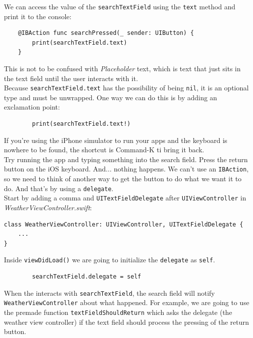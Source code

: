 \documentclass[11pt, letterpaper]{article}
\begin{document}
We can access the value of the \verb+searchTextField+ using the \verb+text+ method and print it to the console:

\begin{verbatim}
    @IBAction func searchPressed(_ sender: UIButton) {
        print(searchTextField.text)
    }
\end{verbatim}

This is not to be confused with \emph{Placeholder} text, which is text that just sits in the text field until the user
interacts with it. \\

Because \verb+searchTextField.text+ has the possibility of being \verb+nil+, it is an optional type and must be unwrapped.
One way we can do this is by adding an exclamation point:

\begin{verbatim}
        print(searchTextField.text!)
\end{verbatim}

If you're using the iPhone simulator to run your apps and the keyboard is nowhere to be found, the shortcut is Command-K ti
bring it back. \\

Try running the app and typing something into the search field. Press the return button on the iOS keyboard. And... nothing
happens. We can't use an \verb+IBAction+, so we need to think of another way to get the button to do what we want it to do.
And that's by using a \verb+delegate+. \\

Start by adding a comma and \verb+UITextFieldDelegate+ after \verb+UIViewController+ in \emph{WeatherViewController.swift}:

\begin{verbatim}
class WeatherViewController: UIViewController, UITextFieldDelegate {
    ...
}
\end{verbatim}

Inside \verb+viewDidLoad()+ we are going to initialize the \verb+delegate+ as \verb+self+. 

\begin{verbatim}
        searchTextField.delegate = self
\end{verbatim}

When the interacts with \verb+searchTextField+, the search field will notify \verb+WeatherViewController+ about what happened.
For example, we are going to use the premade function \newline \verb+textFieldShouldReturn+ which asks the delegate
(the weather view controller) if the text field should process the pressing of the return button. \\
\end{document}
